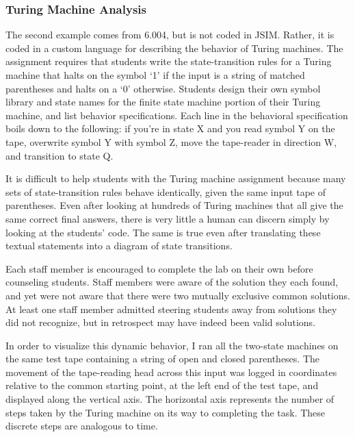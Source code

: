 \documentclass[12pt]{article}
\begin{document}
\subsubsection{Turing Machine Analysis}

The second example comes from 6.004, but is not coded in JSIM. Rather, it is coded in a custom language for describing the behavior of Turing machines. The assignment requires that students write the state-transition rules for a Turing machine that halts on the symbol `1' if the input is a string of matched parentheses and halts on a `0' otherwise. Students design their own symbol library and state names for the finite state machine portion of their Turing machine, and list behavior specifications. Each line in the behavioral specification boils down to the following: if you're in state X and you read symbol Y on the tape, overwrite symbol Y with symbol Z, move the tape-reader in direction W, and transition to state Q.

It is difficult to help students with the Turing machine assignment because many sets of state-transition rules behave identically, given the same input tape of parentheses. Even after looking at hundreds of Turing machines that all give the same correct final answers, there is very little a human can discern simply by looking at the students' code. The same is true even after translating these textual statements into a diagram of state transitions.

Each staff member is encouraged to complete the lab on their own before counseling students. Staff members were aware of the solution they each found, and yet were not aware that there were two mutually exclusive common solutions. At least one staff member admitted steering students away from solutions they did not recognize, but in retrospect may have indeed been valid solutions.

In order to visualize this dynamic behavior, I ran all the two-state machines on the same test tape containing a string of open and closed parentheses. The movement of the tape-reading head across this input was logged in coordinates relative to the common starting point, at the left end of the test tape, and displayed along the vertical axis. The horizontal axis represents the number of steps taken by the Turing machine on its way to completing the task. These discrete steps are analogous to time. 
\end{document}

